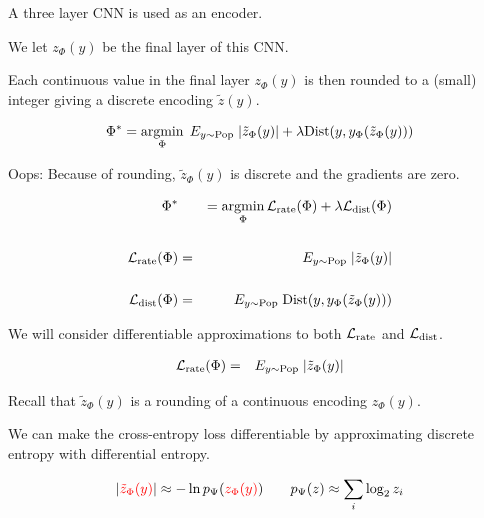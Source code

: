{

A three layer CNN is used as an encoder.

\vfill
We let $z_\Phi(y)$ be the final layer of this CNN.

\vfill
Each continuous value in the final layer $z_\Phi(y)$ is then rounded to a (small) integer giving a discrete encoding $\tilde{z}(y)$.


$$\Phi^* = \operatorname*{argmin}_\Phi \;E_{y \sim \mathrm{Pop}}\;|\tilde{z}_\Phi(y)| + \lambda \mathrm{Dist}(y,y_\Phi(\tilde{z}_\Phi(y)))$$

\vfill
Oops: Because of rounding, $\tilde{z}_\Phi(y)$ is discrete and the gradients are zero.


\begin{eqnarray*}
\Phi^* & & = \operatorname*{argmin}_\Phi {\cal L}_{\mathrm{rate}}(\Phi) + \lambda {\cal L}_{\mathrm{dist}} (\Phi) \\
\\
{\cal L}_{\mathrm{rate}}(\Phi) & = & E_{y \sim \mathrm{Pop}}\;|\tilde{z}_\Phi(y)| \\
\\
{\cal L}_{\mathrm{dist}}(\Phi) & = & E_{y \sim \mathrm{Pop}} \;\mathrm{Dist}(y,y_\Phi(\tilde{z}_\Phi(y)))
\end{eqnarray*}

\vfill
We will consider differentiable approximations to both ${\cal L}_{\mathrm{rate}}$ and ${\cal L}_{\mathrm{dist}}$.


\begin{eqnarray*}
{\cal L}_{\mathrm{rate}}(\Phi) & = & E_{y \sim \mathrm{Pop}}\;|\tilde{z}_\Phi(y)| 
\end{eqnarray*}

\vfill
Recall that {\color{red} $\tilde{z}_\Phi(y)$} is a rounding of a continuous encoding {\color{red} $z_\Phi(y)$}.


\vfill
We can make the cross-entropy loss differentiable by approximating discrete entropy with differential entropy.

\vfill
$$|{\color{red} \tilde{z}_\Phi(y)}| \approx - \ln p_\Psi({\color{red} z_\Phi(y)})\;\;\;\;\;\;\;p_\Psi(z) \approx \sum_i \log_2 z_i$$



}
